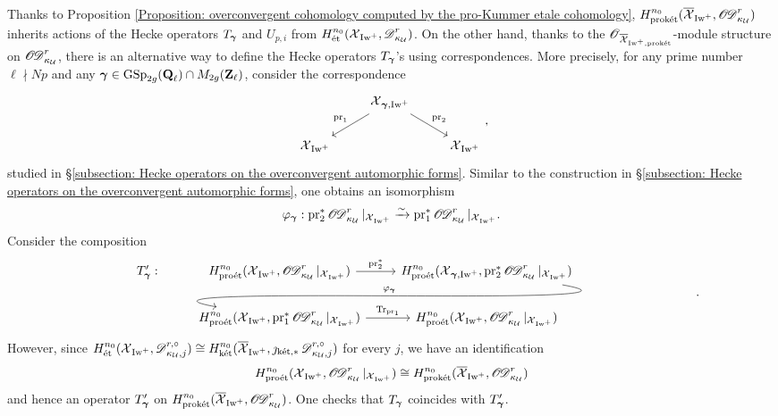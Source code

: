Thanks to Proposition \ref{Proposition: overconvergent cohomology computed by the pro-Kummer etale cohomology}, $H_{\proket}^{n_0}(\overline{\calX}_{\Iw^+}, \sheafOD_{\kappa_{\calU}}^r)$ inherits actions of the Hecke operators $T_{\bfgamma}$ and $U_{p,i}$ from $H^{n_0}_{\et}(\calX_{\Iw^+}, \scrD^r_{\kappa_{\calU}})$. On the other hand, thanks to the $\scrO_{\overline{\calX}_{\Iw^+, \proket}}$-module structure on $\sheafOD_{\kappa_{\calU}}^r$, there is an alternative way to define the Hecke operators $T_{\bfgamma}$'s using correspondences. More precisely, for any prime number $\ell\nmid Np$ and any $\bfgamma\in \GSp_{2g}(\Q_{\ell})\cap M_{2g}(\Z_{\ell})$, consider the correspondence \[
    \begin{tikzcd}
        & \calX_{\bfgamma, \Iw^+}\arrow[dl, "\pr_1"']\arrow[rd, "\pr_2"]\\
        \calX_{\Iw^+} && \calX_{\Iw^+}
    \end{tikzcd},
\] studied in \S \ref{subsection: Hecke operators on the overconvergent automorphic forms}. Similar to the construction in \S \ref{subsection: Hecke operators on the overconvergent automorphic forms}, one obtains an isomorphism \[
    \varphi_{\bfgamma} : \pr_2^*\sheafOD_{\kappa_{\calU}}^r|_{\calX_{\Iw^+}}  \xrightarrow{\sim} \pr_1^*\sheafOD_{\kappa_{\calU}}^r|_{\calX_{\Iw^+}} .
\] Consider the composition \[
    \begin{tikzcd}
    T_{\bfgamma}': &  H^{n_0}_{\proet}(\calX_{\Iw^+}, \sheafOD_{\kappa_{\calU}}^r|_{\calX_{\Iw^+}} )\arrow[r, "\pr_2^*"] & H^{n_0}_{\proet}(\calX_{\bfgamma, \Iw^+}, \pr_2^*\sheafOD_{\kappa_{\calU}}^r|_{\calX_{\Iw^+}} )\arrow[ld, out=-10, in=170, "\varphi_{\bfgamma}"']\\
    &  H^{n_0}_{\proet}(\calX_{\Iw^+}, \pr_1^*\sheafOD_{\kappa_{\calU}}^r|_{\calX_{\Iw^+}} )\arrow[r, "\Tr_{\pr_1}"] & H_{\proet}^{n_0}(\calX_{\Iw^+}, \sheafOD_{\kappa_{\calU}}^r|_{\calX_{\Iw^+}})
    \end{tikzcd}.
\] 
However, since $H_{\et}^{n_0}(\calX_{\Iw^+}, \scrD_{\kappa_{\calU}, j}^{r, \circ})\cong H_{\ket}^{n_0}(\overline{\calX}_{\Iw^+}, \jmath_{\ket, *}\scrD_{\kappa_{\calU}, j}^{r, \circ})$ for every $j$, we have an identification
$$H^{n_0}_{\proet}(\calX_{\Iw^+}, \sheafOD_{\kappa_{\calU}}^r|_{\calX_{\Iw^+}} )\cong H_{\proket}^{n_0}(\overline{\calX}_{\Iw^+}, \sheafOD_{\kappa_{\calU}}^r)$$ and hence an operator $T_{\bfgamma}'$ on $H_{\proket}^{n_0}(\overline{\calX}_{\Iw^+}, \sheafOD_{\kappa_{\calU}}^r)$. One checks that $T_{\bfgamma}$ coincides with $T_{\bfgamma}'$.


